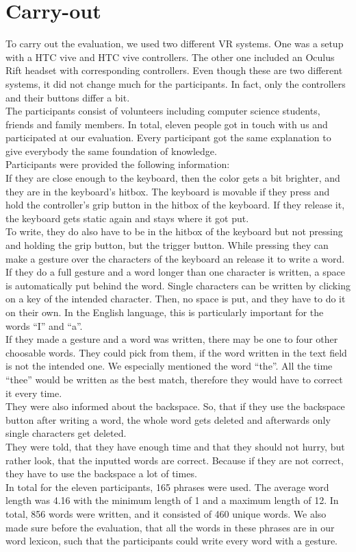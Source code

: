 \section{Carry-out}
To carry out the evaluation, we used two different VR systems. One was a setup with a HTC vive and HTC vive controllers. The other one included an Oculus Rift headset with corresponding controllers. Even though these are two different systems, it did not change much for the participants. In fact, only the controllers and their buttons differ a bit.\\
The participants consist of volunteers including computer science students, friends and family members. In total, eleven people got in touch with us and participated at our evaluation. Every participant got the same explanation to give everybody the same foundation of knowledge.\\
Participants were provided the following information:\\
If they are close enough to the keyboard, then the color gets a bit brighter, and they are in the keyboard's hitbox. The keyboard is movable if they press and hold the controller's grip button in the hitbox of the keyboard. If they release it, the keyboard gets static again and stays where it got put.\\
To write, they do also have to be in the hitbox of the keyboard but not pressing and holding the grip button, but the trigger button. While pressing they can make a gesture over the characters of the keyboard an release it to write a word. If they do a full gesture and a word longer than one character is written, a space is automatically put behind the word. Single characters can be written by clicking on a key of the intended character. Then, no space is put, and they have to do it on their own. In the English language, this is particularly important for the words ``I'' and ``a''.\\
If they made a gesture and a word was written, there may be one to four other choosable words. They could pick from them, if the word written in the text field is not the intended one. We especially mentioned the word ``the''. All the time ``thee'' would be written as the best match, therefore they would have to correct it every time.\\
They were also informed about the backspace. So, that if they use the backspace button after writing a word, the whole word gets deleted and afterwards only single characters get deleted.\\
They were told, that they have enough time and that they should not hurry, but rather look, that the inputted words are correct. Because if they are not correct, they have to use the backspace a lot of times.\\
In total for the eleven participants, 165 phrases were used. The average word length was 4.16 with the minimum length of 1 and a maximum length of 12. In total, 856 words were written, and it consisted of 460 unique words. We also made sure before the evaluation, that all the words in these phrases are in our word lexicon, such that the participants could write every word with a gesture.
